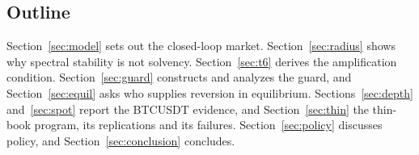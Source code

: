 \documentclass[12pt]{article}
\theoremstyle{definition}
\theoremstyle{remark}
\begin{document}
\subsection{Outline}
Section~\ref{sec:model} sets out the closed-loop market. Section~\ref{sec:radius} shows why spectral stability is not solvency. Section~\ref{sec:t6} derives the amplification condition. Section~\ref{sec:guard} constructs and analyzes the guard, and Section~\ref{sec:equil} asks who supplies reversion in equilibrium. Sections~\ref{sec:depth} and~\ref{sec:spot} report the BTCUSDT evidence, and Section~\ref{sec:thin} the thin-book program, its replications and its failures. Section~\ref{sec:policy} discusses policy, and Section~\ref{sec:conclusion} concludes.
\end{document}
